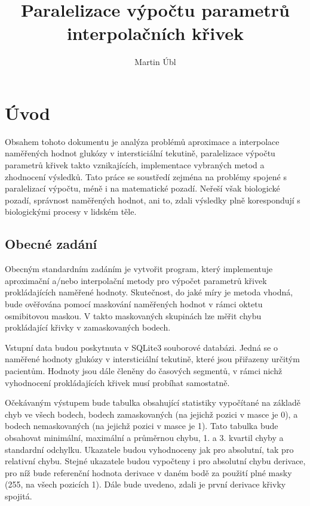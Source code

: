 \documentclass[]{thesiskiv}
\author{Martin Úbl}
\title{Paralelizace výpočtu parametrů interpolačních křivek}
\begin{document}
\maketitle
\tableofcontents

\chapter{Úvod}

Obsahem tohoto dokumentu je analýza problémů aproximace a interpolace naměřených hodnot glukózy v intersticiální tekutině, paralelizace výpočtu parametrů křivek takto vznikajících, implementace vybraných metod a zhodnocení výsledků. Tato práce se soustředí zejména na problémy spojené s paralelizací výpočtu, méně i na matematické pozadí. Neřeší však biologické pozadí, správnost naměřených hodnot, ani to, zdali výsledky plně korespondují s biologickými procesy v lidském těle.

\section{Obecné zadání}

Obecným standardním zadáním je vytvořit program, který implementuje aproximační a/nebo interpolační metody pro výpočet parametrů křivek prokládajících naměřené hodnoty. Skutečnost, do jaké míry je metoda vhodná, bude ověřována pomocí maskování naměřených hodnot v rámci oktetu osmibitovou maskou. V takto maskovaných skupinách lze měřit chybu prokládající křivky v zamaskovaných bodech.

Vstupní data budou poskytnuta v SQLite3 souborové databázi. Jedná se o naměřené hodnoty glukózy v intersticiální tekutině, které jsou přiřazeny určitým pacientům. Hodnoty jsou dále členěny do časových segmentů, v rámci nichž vyhodnocení prokládajících křivek musí probíhat samostatně.

Očekávaným výstupem bude tabulka obsahující statistiky vypočítané na základě chyb ve všech bodech, bodech zamaskovaných (na jejichž pozici v masce je 0), a bodech nemaskovaných (na jejichž pozici v masce je 1). Tato tabulka bude obsahovat minimální, maximální a průměrnou chybu, 1. a 3. kvartil chyby a standardní odchylku. Ukazatele budou vyhodnoceny jak pro absolutní, tak pro relativní chybu. Stejné ukazatele budou vypočteny i pro absolutní chybu derivace, pro níž bude referenční hodnota derivace v daném bodě za použití plné masky (255, na všech pozicích 1). Dále bude uvedeno, zdali je první derivace křivky spojitá.
\end{document}

